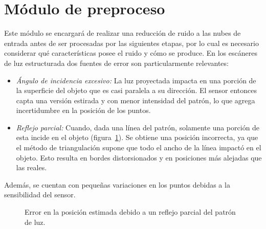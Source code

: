 \section{Módulo de preproceso}
Este módulo se encargará de realizar una reducción de ruido a las nubes de entrada
antes de ser procesadas por las siguientes etapas,
por lo cual es necesario considerar
qué características posee el ruido y cómo se produce.
En los escáneres de luz estructurada dos fuentes de error son particularmente relevantes:
\begin{itemize}
	\item \emph{Ángulo de incidencia excesivo:\/}
		La luz proyectada impacta en una porción de la superficie del objeto
		que es casi paralela a su dirección.
		El sensor entonces capta una versión estirada y con menor intensidad del patrón, lo que 
		agrega incertidumbre en la posición de los puntos.
	\item \emph{Reflejo parcial:\/}
		Cuando, dada una línea del patrón, solamente una porción de esta incide en el objeto (figura~\ref{fig:error_adquisicion}).
		Se obtiene una posición incorrecta, ya que el método de triangulación
		supone que todo el ancho de la línea impactó en el objeto.
		Esto resulta en bordes distorsionados y en posiciones más alejadas que las reales.\cite{Turk:1994:ZPM:192161.192241}
\end{itemize}
Además, se cuentan con pequeñas variaciones en los puntos debidas a la sensibilidad del sensor.

\begin{figure}
	\centering
	\begin{scaletikzpicturetowidth}{.3\linewidth}
		
	\end{scaletikzpicturetowidth}
	\caption{\label{fig:error_adquisicion}Error en la posición estimada debido a un reflejo parcial del patrón de luz.}
\end{figure}

